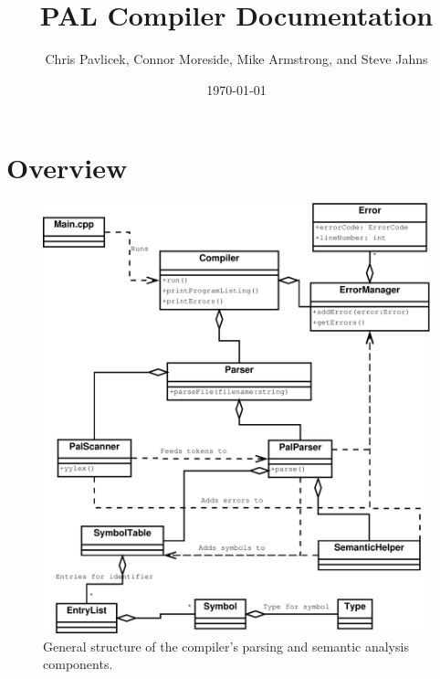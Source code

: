 \documentclass{article}
\begin{document}
\title{PAL Compiler Documentation }
\date{\today}
\author{Chris Pavlicek, Connor Moreside, Mike Armstrong, and Steve Jahns}
\maketitle

%
%

\section*{Overview}

\begin{figure}[h!]
\centering \includegraphics[width=13cm]{uml.pdf}
\caption{General structure of the compiler's parsing and semantic analysis components.}
\end{figure}
\end{document}
